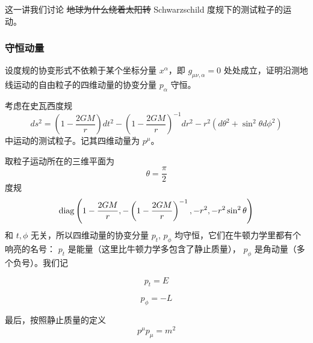 \documentclass[CJK,13pt]{beamer}
\date{}
\begin{document}
  \bch

  \begin{frame}
    这一讲我们讨论 \sout{地球为什么绕着太阳转} Schwarzschild 度规下的测试粒子的运动。

    
  \end{frame}

  \begin{frame}
    \frametitle{守恒动量}

    设度规的协变形式不依赖于某个坐标分量 $x^\alpha$，即 $g_{\mu\nu,\alpha}=0$ 处处成立，证明沿测地线运动的自由粒子的四维动量的协变分量 $p_\alpha$ 守恒。

  \end{frame}



  \begin{frame}
    考虑在史瓦西度规
    $$ ds^2 = \left(1-\frac{2GM}{r}\right)dt^2 - \left(1-\frac{2GM}{r}\right)^{-1} dr^2 - r^2\left(d\theta^2 + \sin^2\theta d\phi^2\right)$$
    中运动的测试粒子。记其四维动量为 $p^\mu$。
  \end{frame}
    
  \begin{frame}
    取粒子运动所在的三维平面为
   {\blue \begin{equation}
      \theta  = \frac{\pi}{2} \label{eq:theta}
    \end{equation}}
    度规
    $$ \mathrm{diag}\,{\left(1-\frac{2GM}{r}, -\left(1-\frac{2GM}{r}\right)^{-1},-r^2, -r^2\sin^2\theta\right)}$$
    和 $t, \phi$ 无关，所以四维动量的协变分量 $p_t$, $p_\phi$ 均守恒，它们在牛顿力学里都有个响亮的名号： $p_t$ 是能量（这里比牛顿力学多包含了静止质量）， $p_\phi$ 是角动量（多个负号）。我们记
    {\blue
    \begin{equation}
      p_t = E \label{eq:t}
    \end{equation}

    \begin{equation}
      p_\phi = -L \label{eq:phi}
    \end{equation}
    }
    最后，按照静止质量的定义
{\blue    \begin{equation}
      p^\mu p_\mu=m^2 \label{eq:m2}
    \end{equation}}
  \end{frame}
  
\end{document}
